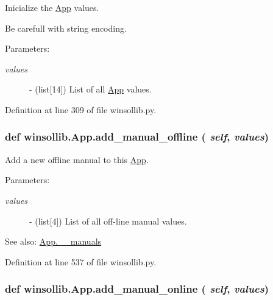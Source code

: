 Inicialize the \hyperlink{classwinsollib_1_1App}{App} values. 

Be carefull with string encoding.

\begin{Desc}
\item[Parameters:]
\begin{description}
\item[{\em values}]- (list\mbox{[}14\mbox{]}) List of all \hyperlink{classwinsollib_1_1App}{App} values. \end{description}
\end{Desc}


Definition at line 309 of file winsollib.py.\hypertarget{classwinsollib_1_1App_961613abdf28b7c3d5aaffb0ed83ebbf}{
\subsubsection[add\_\-manual\_\-offline]{\setlength{\rightskip}{0pt plus 5cm}def winsollib.App.add\_\-manual\_\-offline ( {\em self},  {\em values})}}
\label{classwinsollib_1_1App_961613abdf28b7c3d5aaffb0ed83ebbf}


Add a new offline manual to this \hyperlink{classwinsollib_1_1App}{App}. 

\begin{Desc}
\item[Parameters:]
\begin{description}
\item[{\em values}]- (list\mbox{[}4\mbox{]}) List of all off-line manual values.\end{description}
\end{Desc}
\begin{Desc}
\item[See also:]\hyperlink{classwinsollib_1_1App_1af4cfd72ef4f2e4ce69304a2aa34b5f}{App.\_\-\_\-manuals} \end{Desc}


Definition at line 537 of file winsollib.py.\hypertarget{classwinsollib_1_1App_7d4de96b97f8eac2ceab3ec79443441b}{
\subsubsection[add\_\-manual\_\-online]{\setlength{\rightskip}{0pt plus 5cm}def winsollib.App.add\_\-manual\_\-online ( {\em self},  {\em values})}}
\label{classwinsollib_1_1App_7d4de96b97f8eac2ceab3ec79443441b}


